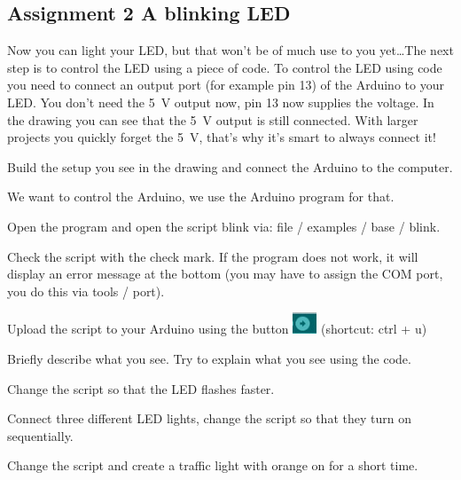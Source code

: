 \documentclass{arduino}
\begin{document}
\newpage
\subsection{Assignment 2 A blinking LED}


Now you can light your LED, but that won't be of much use to you yet\dots The next step is to control the LED using a piece of code. To control the LED using code you need to connect an output port (for example pin 13) of the Arduino to your LED. You don't need the \SI{5}{\volt} output now, pin 13 now supplies the voltage. In the drawing you can see that the \SI{5}{\volt} output is still connected. With larger projects you quickly forget the \SI{5}{\volt}, that's why it's smart to always connect it!

\begin{alphalist}
\item Build the setup you see in the drawing and connect the Arduino to the computer.
\end{alphalist}

We want to control the Arduino, we use the Arduino program for that.

\begin{alphalist}
\item Open the program and open the script blink via: file / examples / base / blink.

\item Check the script with the check mark. If the program does not work, it will display an error message at the bottom (you may have to assign the COM port, you do this via tools / port).

\item Upload the script to your Arduino using the button \includegraphics{10. Arduino upload} (shortcut: ctrl + u)

\item Briefly describe what you see. Try to explain what you see using the code.

\item Change the script so that the LED flashes faster.

\item Connect three different LED lights, change the script so that they turn on sequentially.

\item Change the script and create a traffic light with orange on for a short time.
\end{alphalist}
\end{document}
